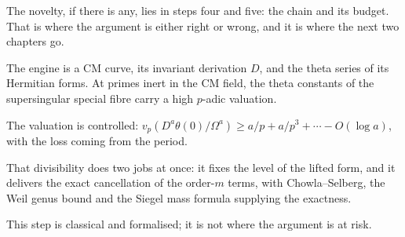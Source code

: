 The novelty, if there is any, lies in steps four and five: the chain and its
budget. That is where the argument is either right or wrong, and it is where
the next two chapters go.

\begin{keytakeaways}
\item The engine is a CM curve, its invariant derivation $D$, and the theta
series of its Hermitian forms. At primes inert in the CM field, the theta
constants of the supersingular special fibre carry a high $p$-adic valuation.
\item The valuation is controlled: $v_p\!\left(D^a\theta(0)/\Omega^a\right) \ge
a/p + a/p^3 + \cdots - O(\log a)$, with the loss coming from the period.
\item That divisibility does two jobs at once: it fixes the level of the
lifted form, and it delivers the exact cancellation of the order-$m$ terms,
with Chowla--Selberg, the Weil genus bound and the Siegel mass formula
supplying the exactness.
\item This step is classical and formalised; it is not where the argument is
at risk.
\end{keytakeaways}
